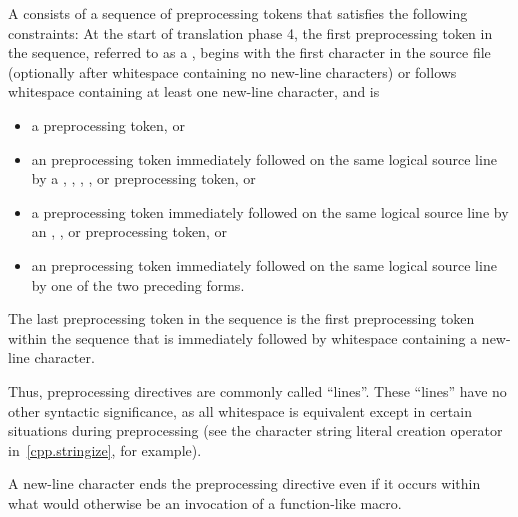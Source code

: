 \pnum
A  consists of a sequence of preprocessing tokens
that satisfies the following constraints:
At the start of translation phase 4,
the first preprocessing token in the sequence,
referred to as a ,
begins with the first character in the source file
(optionally after whitespace containing no new-line characters) or
follows whitespace containing at least one new-line character,
and is

\begin{itemize}
\item
a \tcode{\#} preprocessing token, or

\item
an  preprocessing token
immediately followed on the same logical source line by a
,
\tcode{<},
,
, or
\tcode{:}
preprocessing token, or

\item
a  preprocessing token
immediately followed on the same logical source line by an
,
\tcode{:}, or
\tcode{;}
preprocessing token, or

\item
an  preprocessing token
immediately followed on the same logical source line by
one of the two preceding forms.
\end{itemize}

The last preprocessing token in the sequence is the first preprocessing token within the sequence that
is immediately followed by whitespace containing a new-line character.
\begin{footnote}
Thus,
preprocessing directives are commonly called ``lines''.
These ``lines'' have no other syntactic significance,
as all whitespace is equivalent except in certain situations
during preprocessing (see the
\tcode{\#}
character string literal creation operator in~\ref{cpp.stringize}, for example).
\end{footnote}
\begin{note}
A new-line character ends the preprocessing directive even if it occurs
within what would otherwise be an invocation of a function-like macro.
\end{note}

